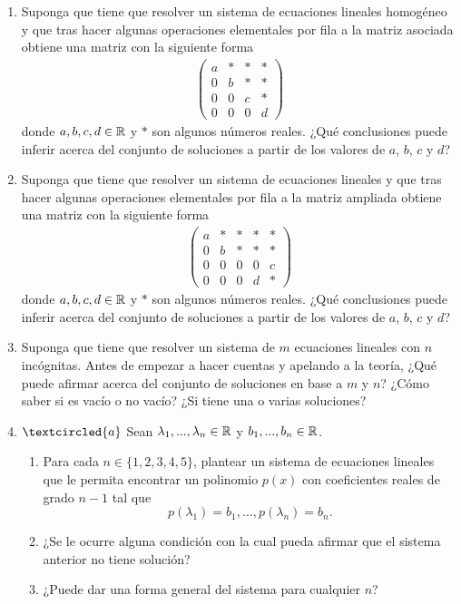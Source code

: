 \begin{enumerate}[topsep=6pt, itemsep=.4cm]
\item Suponga que tiene que resolver un sistema de ecuaciones lineales homogéneo y que tras hacer algunas operaciones elementales por fila a la matriz asociada obtiene una matriz con la siguiente forma
\begin{align*}
\left(
\begin{array}{cccc}
a & * & * & *\\
0 & b & * & *\\
0 & 0 & c & *\\
0 & 0 & 0 & d
\end{array}
\right)
\end{align*}
donde $a,b,c,d\in\mathbb R$ y $*$ son algunos números reales.
¿Qué conclusiones puede inferir acerca del conjunto de soluciones a partir de los valores de $a$, $b$, $c$ y $d$?



\item Suponga que tiene que resolver un sistema de ecuaciones lineales y que tras hacer algunas operaciones elementales por fila a la matriz ampliada obtiene una matriz con la siguiente forma
\begin{align*}
\left(
\begin{array}{cccc|c}
a & * & * & * & *\\
0 & b & * & * & *\\
0 & 0 & 0 & 0 & c\\
0 & 0 & 0 & d & *
\end{array}
\right)
\end{align*}
donde $a,b,c,d\in\mathbb R$ y $*$ son algunos números reales.
¿Qué conclusiones puede inferir acerca del conjunto de soluciones a partir de los valores de $a$, $b$, $c$ y $d$?



\item\label{soluciones-ecuaciones} Suponga que tiene que resolver un sistema de $m$ ecuaciones lineales con $n$ incógnitas. Antes de empezar a hacer cuentas y apelando a la teoría, ¿Qué puede afirmar acerca del conjunto de soluciones en base a $m$ y $n$? ¿Cómo saber si es vacío o no vacío? ¿Si tiene una o varias soluciones?




\item\label{polinomios} $\textcircled{a}$ Sean $\lambda_1, ..., \lambda_n\in\mathbb R$ y $b_1, ..., b_n\in\mathbb R$.


\begin{enumerate}
 \item\label{polinomios-a} Para cada $n\in\{1,2,3,4,5\}$, plantear un sistema de ecuaciones lineales que le permita encontrar un polinomio $p(x)$ con coeficientes reales de grado $n-1$ tal que
 $$
 p(\lambda_1)=b_1, \dots, p(\lambda_n)=b_n.
 $$
\item\label{polinomios-b} ¿Se le ocurre alguna condición con la cual pueda afirmar que el sistema anterior no tiene solución?
\item\label{polinomios-c}  ¿Puede dar una forma general del sistema para cualquier $n$?
\end{enumerate}


\end{enumerate}














